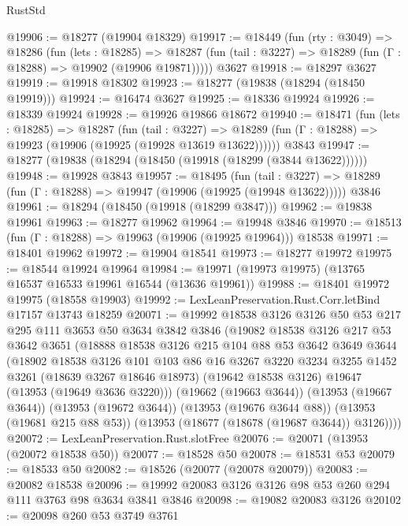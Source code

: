 \begin{lexlean}{RustStd}
\begin{coremodule}
@19906 := @18277 (@19904 @18329)
@19917 := @18449
    (fun (rty : @3049) =>
    @18286
      (fun (lets : @18285) =>
      @18287 (fun (tail : @3227) => @18289 (fun (Γ : @18288) => @19902 (@19906 @19871)))))
    @3627
@19918 := @18297 @3627
@19919 := @19918 @18302
@19923 := @18277 (@19838 (@18294 (@18450 @19919)))
@19924 := @16474 @3627
@19925 := @18336 @19924
@19926 := @18339 @19924
@19928 := @19926 @19866 @18672
@19940 := @18471
    (fun (lets : @18285) =>
    @18287
      (fun (tail : @3227) =>
      @18289 (fun (Γ : @18288) => @19923 (@19906 (@19925 (@19928 @13619 @13622))))))
    @3843
@19947 := @18277 (@19838 (@18294 (@18450 (@19918 (@18299 (@3844 @13622))))))
@19948 := @19928 @3843
@19957 := @18495
    (fun (tail : @3227) => @18289 (fun (Γ : @18288) => @19947 (@19906 (@19925 (@19948 @13622)))))
    @3846
@19961 := @18294 (@18450 (@19918 (@18299 @3847)))
@19962 := @19838 @19961
@19963 := @18277 @19962
@19964 := @19948 @3846
@19970 := @18513 (fun (Γ : @18288) => @19963 (@19906 (@19925 @19964))) @18538
@19971 := @18401 @19962
@19972 := @19904 @18541
@19973 := @18277 @19972
@19975 := @18544 @19924 @19964
@19984 := @19971 (@19973 @19975) (@13765 @16537 @16533 @19961 @16544 (@13636 @19961))
@19988 := @18401 @19972 @19975 (@18558 @19903)
@19992 := LexLeanPreservation.Rust.Corr.letBind @17157 @13743 @18259
@20071 := @19992
    @18538
    @3126
    @3126
    @50
    @53
    @217
    @295
    @111
    @3653
    @50
    @3634
    @3842
    @3846
    (@19082
      @18538
      @3126
      @217
      @53
      @3642
      @3651
      (@18888
        @18538
        @3126
        @215
        @104
        @88
        @53
        @3642
        @3649
        @3644
        (@18902
          @18538
          @3126
          @101
          @103
          @86
          @16
          @3267
          @3220
          @3234
          @3255
          @1452
          @3261
          (@18639 @3267 @18646 @18973)
          (@19642 @18538 @3126)
          @19647
          (@13953 (@19649 @3636 @3220)))
        (@19662 (@19663 @3644))
        (@13953 (@19667 @3644))
        (@13953 (@19672 @3644))
        (@13953 (@19676 @3644 @88))
        (@13953 (@19681 @215 @88 @53))
        (@13953 (@18677 (@18678 (@19687 @3644)) @3126))))
@20072 := LexLeanPreservation.Rust.slotFree
@20076 := @20071 (@13953 (@20072 @18538 @50))
@20077 := @18528 @50
@20078 := @18531 @53
@20079 := @18533 @50
@20082 := @18526 (@20077 (@20078 @20079))
@20083 := @20082 @18538
@20096 := @19992 @20083 @3126 @3126 @98 @53 @260 @294 @111 @3763 @98 @3634 @3841 @3846
@20098 := @19082 @20083 @3126
@20102 := @20098 @260 @53 @3749 @3761

\end{coremodule}
\end{lexlean}
